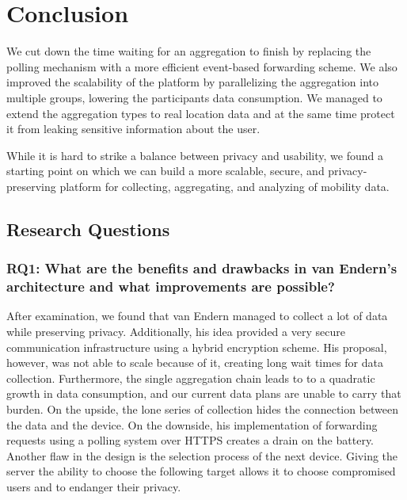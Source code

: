 
\chapter{Conclusion}\label{chapter:conclusion}
We cut down the time waiting for an aggregation to finish by replacing the polling mechanism with a more efficient event-based forwarding scheme. We also improved the scalability of the platform by parallelizing the aggregation into multiple groups, lowering the participants data consumption. We managed to extend the aggregation types to real location data and at the same time protect it from leaking sensitive information about the user. 

While it is hard to strike a balance between privacy and usability, we found a starting point on which we can build a more scalable, secure, and privacy-preserving platform for collecting, aggregating, and analyzing of mobility data. 

\section{Research Questions}
\subsection*{RQ1: What are the benefits and drawbacks in van Endern's architecture and what improvements are possible?}
After examination, we found that van Endern managed to collect a lot of data while preserving privacy. Additionally, his idea provided a very secure communication infrastructure using a hybrid encryption scheme. His proposal, however, was not able to scale because of it, creating long wait times for data collection.
Furthermore, the single aggregation chain leads to to a quadratic growth in data consumption, and our current data plans are unable to carry that burden. On the upside, the lone series of collection hides the connection between the data and the device. On the downside, his implementation of forwarding requests using a polling system over HTTPS creates a drain on the battery.
Another flaw in the design is the selection process of the next device. Giving the server the ability to choose the following target allows it to choose compromised users and to endanger their privacy. 

